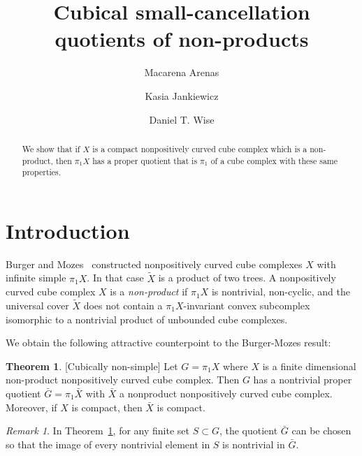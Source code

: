 \documentclass[12pt,oneside]{amsart}
\title[Small-cancellation quotients of non-products]
{Cubical small-cancellation quotients of non-products}
\author{Macarena Arenas}
\author{Kasia Jankiewicz}
\author{Daniel T. Wise}
\theoremstyle{definition}
\newtheorem{theorem}[thm]{Theorem}
\theoremstyle{definition}
\theoremstyle{remark}
\newtheorem{remark}[thm]{Remark}
\begin{document}
\begin{abstract}
We show that if $X$ is a compact nonpositively curved cube complex which is a non-product, then $\pi_1 X$  has a proper quotient that is $\pi_1$ of a cube  complex with these same properties.


\end{abstract}
\setcounter{tocdepth}{1}
\maketitle

\vspace{-15pt}
\tableofcontents
\vspace{-15pt}

\section{Introduction}

Burger and Mozes~\cite{BurgerMozes97} constructed nonpositively curved cube complexes $X$ with infinite simple $\pi_1X$.
In that case $\widetilde X$ is a product of two trees.
A nonpositively curved cube complex $X$ is a \emph{non-product} if
$\pi_1X$ is nontrivial, non-cyclic, and the universal cover $\widetilde X$ does not contain a $\pi_1X$-invariant convex subcomplex isomorphic to a nontrivial product of unbounded cube complexes.

We obtain the following attractive counterpoint to the Burger-Mozes result:

\begin{theorem}\label{thm: main intro cocompact}
[Cubically non-simple]
Let $G=\pi_1X$  where $X$ is a finite dimensional non-product nonpositively curved cube complex. Then $G$ has a nontrivial proper quotient $\bar G=\pi_1 \bar X$ with $\bar X$ a nonproduct nonpositively curved cube complex.
Moreover, if $X$ is compact, then $\bar X$ is compact.
\end{theorem}



\begin{remark}
In Theorem~\ref{thm: main intro cocompact},
for any finite set $S \subset G$, the quotient $\bar G$ can be chosen so that the image of  every nontrivial element in $S$ is nontrivial in $\bar G$. 
\end{remark}
\end{document}
